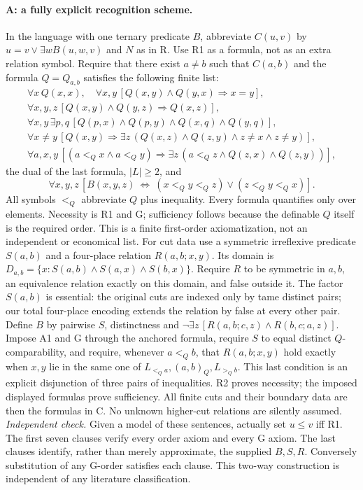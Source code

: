 \paragraph{A: a fully explicit recognition scheme.}\label{lem:axioms}
In the language with one ternary predicate $B$, abbreviate
$C(u,v)$ by $u=v\vee\exists w B(u,w,v)$ and $N$ as in R. Use R1 as a formula, not as an extra relation symbol. Require that there exist $a\ne b$ such that $C(a,b)$ and the formula $Q=Q_{a,b}$ satisfies the following finite list:
\[
\begin{gathered}
\forall x\,Q(x,x),\quad\forall x,y\,[Q(x,y)\land Q(y,x)\Rightarrow x=y],\\
\forall x,y,z\,[Q(x,y)\land Q(y,z)\Rightarrow Q(x,z)],\\
\forall x,y\,\exists p,q\,[Q(p,x)\land Q(p,y)\land Q(x,q)\land Q(y,q)],\\
\forall x\ne y\,[Q(x,y)\Rightarrow\exists z\,(Q(x,z)\land Q(z,y)\land z\ne x\land z\ne y)],\\
\forall a,x,y\,[(a<_Qx\land a<_Qy)\Rightarrow\exists z\,(a<_Qz\land Q(z,x)\land Q(z,y))],
\end{gathered}
\]
the dual of the last formula, $|L|\geq2$, and
\[
\forall x,y,z\,[B(x,y,z)\ \Longleftrightarrow\ (x<_Qy<_Qz)\vee(z<_Qy<_Qx)].                 \tag{A1}
\]
All symbols $<_Q$ abbreviate $Q$ plus inequality. Every formula quantifies only over elements. Necessity is R1 and G; sufficiency follows because the definable $Q$ itself is the required order. This is a finite first-order axiomatization, not an independent or economical list.
For cut data use a symmetric irreflexive predicate $S(a,b)$ and a four-place relation $R(a,b;x,y)$. Its domain is $D_{a,b}=\{x:S(a,b)\land S(a,x)\land S(b,x)\}$. Require $R$ to be symmetric in $a,b$, an equivalence relation exactly on this domain, and false outside it. The factor $S(a,b)$ is essential: the original cuts are indexed only by tame distinct pairs; our total four-place encoding extends the relation by false at every other pair. Define $B$ by pairwise $S$, distinctness and
$\neg\exists z\,[R(a,b;c,z)\land R(b,c;a,z)]$.
Impose A1 and G through the anchored formula, require $S$ to equal distinct $Q$-comparability, and require, whenever $a<_Qb$, that $R(a,b;x,y)$ hold exactly when $x,y$ lie in the same one of $L_{<_Qa},(a,b)_Q,L_{>_Qb}$. This last condition is an explicit disjunction of three pairs of inequalities. R2 proves necessity; the imposed displayed formulas prove sufficiency. All finite cuts and their boundary data are then the formulas in C. No unknown higher-cut relations are silently assumed.
\emph{Independent check.} Given a model of these sentences, actually set $u\leq v$ iff R1. The first seven clauses verify every order axiom and every G axiom. The last clauses identify, rather than merely approximate, the supplied $B,S,R$. Conversely substitution of any G-order satisfies each clause. This two-way construction is independent of any literature classification.


